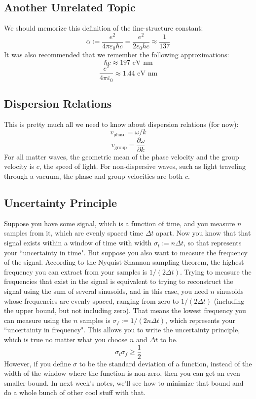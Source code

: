 \documentclass[12pt]{article}
\begin{document}
\subsection{Another Unrelated Topic}
We should memorize this definition of the fine-structure constant:
\[ \alpha := \frac{e^2}{4 \pi \varepsilon_0 \hbar c} = \frac{e^2}{2 \varepsilon_0 h c} \approx \frac{1}{137} \]
It was also recommended that we remember the following approximations:
\[ \hbar c \approx 197 \text{ eV nm} \]
\[ \frac{e^2}{4 \pi \varepsilon_0} \approx 1.44 \text{ eV nm} \]

\subsection{Dispersion Relations}
This is pretty much all we need to know about dispersion relations (for now):
\[ v_\text{phase} = \omega / k \]
\[ v_\text{group} = \frac{\partial \omega}{\partial k} \]
For all matter waves, the geometric mean of the phase velocity and the group velocity is $c$, the speed of light. For non-dispersive waves, such as light traveling through a vacuum, the phase and group velocities are both $c$.

\subsection{Uncertainty Principle}
Suppose you have some signal, which is a function of time, and you measure $n$ samples from it, which are evenly spaced time $\Delta t$ apart. Now you know that that signal exists within a window of time with width $\sigma_t := n \Delta t$, so that represents your ``uncertainty in time". But suppose you also want to measure the frequency of the signal. According to the Nyquist-Shannon sampling theorem, the highest frequency you can extract from your samples is $1/(2 \Delta t)$. Trying to measure the frequencies that exist in the signal is equivalent to trying to reconstruct the signal using the sum of several sinusoids, and in this case, you need $n$ sinusoids whose frequencies are evenly spaced, ranging from zero to $1/(2\Delta t)$ (including the upper bound, but not including zero). That means the lowest frequency you can measure using the $n$ samples is $\sigma_f := 1/(2n\Delta t)$, which represents your ``uncertainty in frequency". This allows you to write the uncertainty principle, which is true no matter what you choose $n$ and $\Delta t$ to be.
\[ \sigma_t \sigma_f \geq \frac{1}{2} \]
However, if you define $\sigma$ to be the standard deviation of a function, instead of the width of the window where the function is non-zero, then you can get an even smaller bound. In next week's notes, we'll see how to minimize that bound and do a whole bunch of other cool stuff with that.
\end{document}
